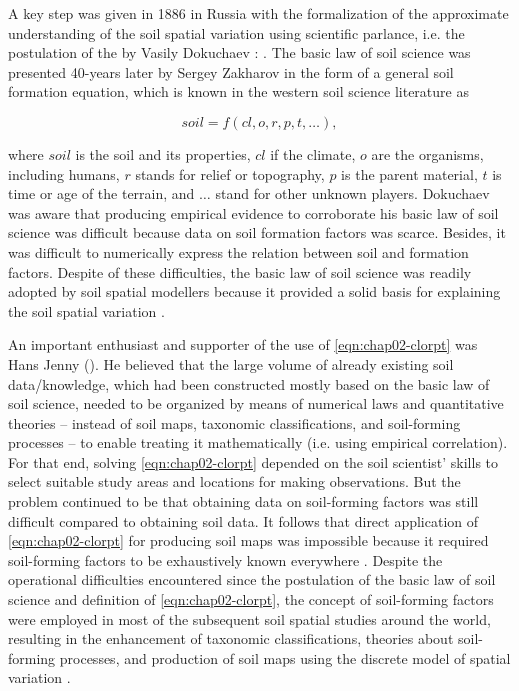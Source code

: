 A key step was given in 1886 in Russia with the formalization of the approximate understanding of the soil 
spatial variation using scientific parlance, i.e. the postulation of the  by 
Vasily Dokuchaev \cite{Florinsky2012}: . The basic law of soil science was presented 40-years later by Sergey Zakharov in the form of a 
general soil formation equation, which is known in the western soil science literature as \cite{Jenny1941, 
Florinsky2012}

\begin{equation}
 soil = f(cl, o, r, p, t, \ldots),
\end{equation}\label{eqn:chap02-clorpt}

\noindent where $soil$ is the soil and its properties, $cl$ if the climate, $o$ 
are the organisms, including humans, $r$ stands for relief or topography, $p$ is the 
parent material, $t$ is time or age of the terrain, and $\ldots$ stand for other unknown 
players. Dokuchaev was aware that producing empirical evidence to corroborate his basic law of soil science was 
difficult because data on soil formation factors was scarce. Besides, it was difficult to numerically express 
the relation between soil and formation factors. Despite of these difficulties, the basic law of soil science 
was readily adopted by soil spatial modellers because it provided a solid basis for explaining the soil spatial 
variation \cite{Smith1986}.

An important enthusiast and supporter of the use of \autoref{eqn:chap02-clorpt} was Hans Jenny 
(\citeyear{Jenny1941}). He believed that the large volume of already existing soil data/knowledge, which had 
been constructed mostly based on the basic law of soil science, needed to be organized by means of numerical 
laws and quantitative theories -- instead of soil maps, taxonomic classifications, and soil-forming processes 
-- to enable treating it mathematically (i.e. using empirical correlation). For that end, solving 
\autoref{eqn:chap02-clorpt} depended on the soil scientist' skills to select suitable study areas and locations 
for making observations. But the problem continued to be that obtaining data on soil-forming factors was still 
difficult compared to obtaining soil data. It follows that direct application of \autoref{eqn:chap02-clorpt} 
for producing soil maps was impossible because it required soil-forming factors to be exhaustively known 
everywhere \cite{Jenny1941}. Despite the operational difficulties encountered since the postulation of the 
basic law of soil science and definition of \autoref{eqn:chap02-clorpt}, the concept of soil-forming factors 
were employed in most of the subsequent soil spatial studies around the world, resulting in the enhancement of 
taxonomic classifications, theories about soil-forming processes, and production of soil maps using the 
discrete model of spatial variation \cite{Schelling1970, Hudson1992, BockheimEtAl2000, Legros2006, 
KrasilnikovEtAl2009b, HarteminkEtAl2013}.


